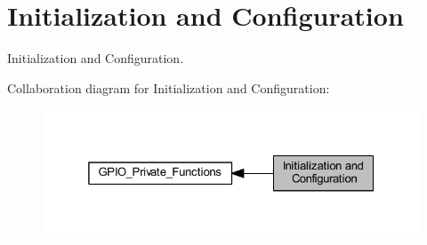 \hypertarget{group___g_p_i_o___group1}{}\section{Initialization and Configuration}
\label{group___g_p_i_o___group1}


Initialization and Configuration.  


Collaboration diagram for Initialization and Configuration\+:\nopagebreak
\begin{figure}[H]
\begin{center}
\leavevmode
\includegraphics[width=325pt]{group___g_p_i_o___group1}
\end{center}
\end{figure}
